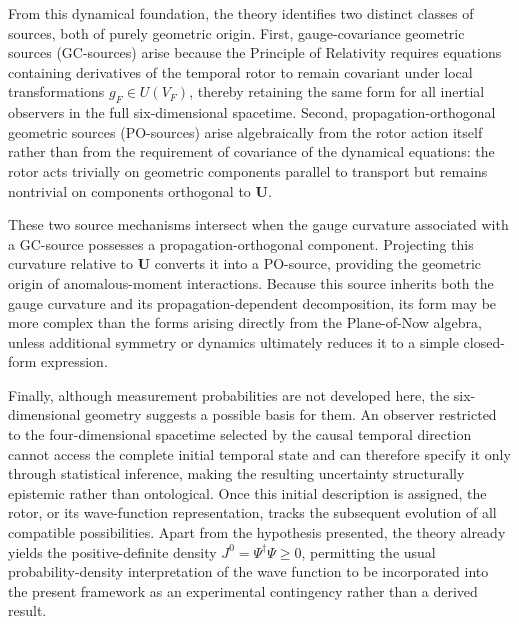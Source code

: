 From this dynamical foundation, the theory identifies two distinct classes of sources, both of purely geometric origin. First, gauge-covariance geometric sources (GC-sources) arise because the Principle of Relativity requires equations containing derivatives of the temporal rotor to remain covariant under local transformations $g_{F}\in U(V_{F})$, thereby retaining the same form for all inertial observers in the full six-dimensional spacetime. Second, propagation-orthogonal geometric sources (PO-sources) arise algebraically from the rotor action itself rather than from the requirement of covariance of the dynamical equations: the rotor acts trivially on geometric components parallel to transport but remains nontrivial on components orthogonal to $\mathbf{U}$.

These two source mechanisms intersect when the gauge curvature associated with a GC-source possesses a propagation-orthogonal component. Projecting this curvature relative to $\mathbf{U}$ converts it into a PO-source, providing the geometric origin of anomalous-moment interactions. Because this source inherits both the gauge curvature and its propagation-dependent decomposition, its form may be more complex than the forms arising directly from the Plane-of-Now algebra, unless additional symmetry or dynamics ultimately reduces it to a simple closed-form expression.

Finally, although measurement probabilities are not developed here, the six-dimensional geometry suggests a possible basis for them. An observer restricted to the four-dimensional spacetime selected by the causal temporal direction cannot access the complete initial temporal state and can therefore specify it only through statistical inference, making the resulting uncertainty structurally epistemic rather than ontological. Once this initial description is assigned, the rotor, or its wave-function representation, tracks the subsequent evolution of all compatible possibilities. Apart from the hypothesis presented, the theory already yields the positive-definite density $J^{0} = \Psi^{\dagger}\Psi \ge 0$, permitting the usual probability-density interpretation of the wave function to be incorporated into the present framework as an experimental contingency rather than a derived result.
